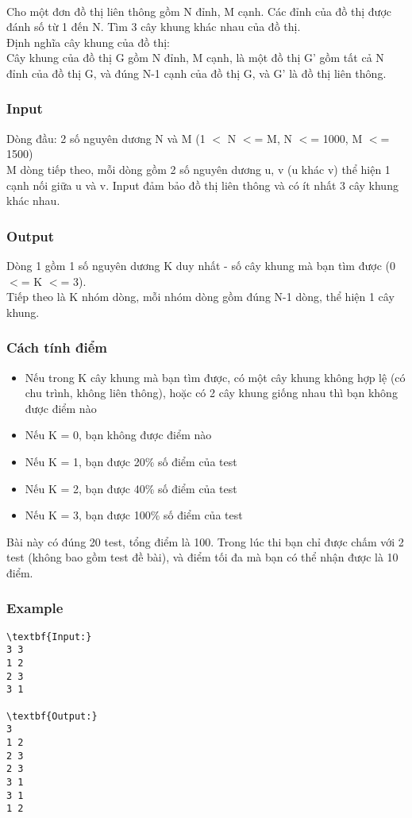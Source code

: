 

 

Cho một đơn đồ thị liên thông gồm N đỉnh, M cạnh. Các đỉnh của đồ thị được đánh số từ 1 đến N. Tìm 3 cây khung khác nhau của đồ thị.
\\Định nghĩa cây khung của đồ thị:
\\Cây khung của đồ thị G gồm N đỉnh, M cạnh, là một đồ thị G’ gồm tất cả N đỉnh của đồ thị G, và đúng N-1 cạnh của đồ thị G, và G’ là đồ thị liên thông.

\subsubsection{Input}

Dòng đầu: 2 số nguyên dương N và M (1 $<$ N $<$= M, N $<$= 1000, M $<$= 1500)
\\M dòng tiếp theo, mỗi dòng gồm 2 số nguyên dương u, v (u khác v) thể hiện 1 cạnh nối giữa u và v. Input đảm bảo đồ thị liên thông và có ít nhất 3 cây khung khác nhau.

\subsubsection{Output}

Dòng 1 gồm 1 số nguyên dương K duy nhất - số cây khung mà bạn tìm được (0 $<$= K $<$= 3).
\\Tiếp theo là K nhóm dòng, mỗi nhóm dòng gồm đúng N-1 dòng, thể hiện 1 cây khung.

\subsubsection{Cách tính điểm}
\begin{itemize}
	\item Nếu trong K cây khung mà bạn tìm được, có một cây khung không hợp lệ (có chu trình, không liên thông), hoặc có 2 cây khung giống nhau thì bạn không được điểm nào
	\item Nếu K = 0, bạn không được điểm nào
	\item Nếu K = 1, bạn được 20\% số điểm của test
	\item Nếu K = 2, bạn được 40\% số điểm của test
	\item Nếu K = 3, bạn được 100\% số điểm của test
\end{itemize}

Bài này có đúng 20 test, tổng điểm là 100. Trong lúc thi bạn chỉ được chấm với 2 test (không bao gồm test đề bài), và điểm tối đa mà bạn có thể nhận được là 10 điểm.

\subsubsection{Example}
\begin{verbatim}
\textbf{Input:}
3 3
1 2
2 3
3 1

\textbf{Output:}
3
1 2
2 3
2 3
3 1
3 1
1 2\end{verbatim}